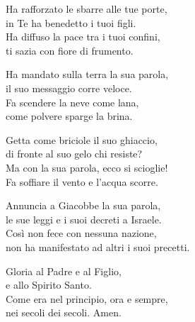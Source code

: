 

\spazio

\strofa Ha rafforzato le sbarre alle tue porte,\\
in Te ha benedetto i tuoi figli.\\
Ha diffuso la pace tra i tuoi confini,\\
ti sazia con fiore di frumento.

\spazio


\spazio

\strofa Ha mandato sulla terra la sua parola,\\
il suo messaggio corre veloce.\\
Fa scendere la neve come lana,\\
come polvere sparge la brina.

\spazio


\spazio

\strofa Getta come briciole il suo ghiaccio,\\
di fronte al suo gelo chi resiste?\\
Ma con la sua parola, ecco si scioglie!\\
Fa soffiare il vento e l'acqua scorre.

\spazio


\spazio

\strofa Annuncia a Giacobbe la sua parola,\\
le sue leggi e i suoi decreti a Israele.\\
Così non fece con nessuna nazione,\\
non ha manifestato ad altri i suoi precetti.

\spazio


\spazio

\strofa Gloria al Padre e al Figlio,\\
e allo Spirito Santo.\\
Come era nel principio, ora e sempre,\\
nei secoli dei secoli. Amen.

\spazio

